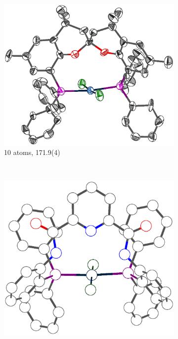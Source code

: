 \begin{figure}[htbp]
        \centering
        \begin{subfigure}[b]{0.4\textwidth}
                \includegraphics[width=\textwidth]{../Othercrystals/PtCl2/Trans/196130.eps}
                \caption{10 atoms, 171.9(4)\degrees}
                \label{WABXIH}
        \end{subfigure}%
        ~ 
        \begin{subfigure}[b]{0.3\textwidth}
                \includegraphics[width=\textwidth]{../Othercrystals/PtCl2/Trans/NURGAI.eps}

\end{subfigure}
\end{figure}
